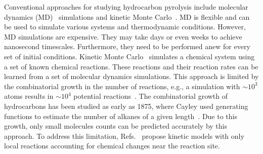 \documentclass[fleqn,11pt]{article}
\begin{document}
%	
%	
%	

Conventional approaches for studying hydrocarbon pyrolysis include molecular dynamics {(MD)}~\cite{chengThermodynamics2023,chenTransferable2019,dufour-decieuxTemperature2022,dufour-decieuxPredicting2023} simulations and kinetic Monte Carlo~\cite{dufour-decieuxAtomicLevel2021,dufour-decieuxTemperature2022}. 
MD is flexible and can be used to simulate various systems and thermodynamic conditions. 
However, MD simulations are expensive. They may take days or even weeks to achieve nanosecond timescales. Furthermore, they need to be performed anew for every set of initial conditions. 
Kinetic Monte Carlo~\cite{gillespieGeneral1976,highamModeling2008} simulates a chemical system using a set of known chemical reactions. 
These reactions and their reaction rates can be learned from a set of molecular dynamics simulations. This approach is limited by the combinatorial growth in the number of reactions, e.g., a simulation with $\sim10^3$ atoms results in $\sim10^4$ potential reactions~\cite{yangLearning2017,yangDataDriven2019,chenTransferable2019}.
The combinatorial growth of hydrocarbons has been studied as early as 1875, where Cayley used generating functions to estimate the number of alkanes of a given length~\cite{cayley1875ueber,rains1999cayley}.
Due to this growth, only small molecules counts can be predicted accurately by this approach.
To address this limitation, Refs.~\cite{dufour-decieuxAtomicLevel2021,dufour-decieuxTemperature2022} propose kinetic models with only local reactions accounting for chemical changes near the reaction site. 
\end{document}
